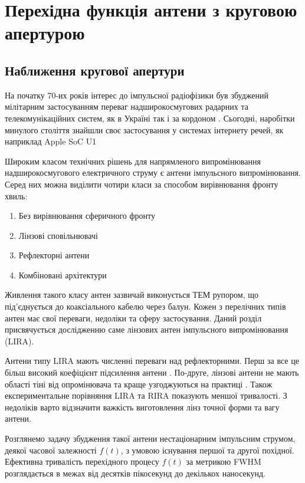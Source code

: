 \chapter{Перехідна функція антени з круговою апертурою}
\label{ch:linear}

\section{Наближення кругової апертури}

На початку 70-их років інтерес до імпульсної радіофізики був збуджений
мілітарним застосуванням переваг надширокосмугових радарних та 
телекомунікаційних систем, як в Україні \cite{imp:Dumin1996} так 
і за кордоном \cite{imp:BaumIN0105}. Сьогодні, наробітки минулого 
століття знайшли своє застосування у системах інтернету речей, як 
наприклад Apple SoC U1 %

Широким класом технічних рішень для напрямленого випромінювання 
надширокосмугового електричного струму є антени імпульсного випромінювання.
Серед них можна виділити чотири класи за способом вирівнювання фронту хвиль:
%
\begin{enumerate}
	\item Без вирівнювання сферичного фронту
	\item Лінзові сповільнювачі
	\item Рефлекторні антени
	\item Комбіновані архітектури \cite{imp:BaumSSN0379}
\end{enumerate}

Живлення такого класу антен зазвичай виконується ТЕМ рупором, що під'єднується 
до коаксіального кабелю через балун. Кожен з перелічних типів антен має свої
переваги, недоліки та сферу застосування. Даний розділ присвячується 
дослідженню саме лінзових антен імпульсного випромінювання (LIRA). 

Антени типу LIRA мають численні переваги над рефлекторними. Перш за все це
більш високий коефіцієнт підсилення антени \cite{imp:BaumUWBSP1}. По-друге,
лінзові антени не мають області тіні від опромінювача та краще узгоджуються
на практиці \cite{imp:BaumSSN0377}. Також експериментальне порівняння LIRA 
та RIRA показують меншої тривалості. З недоліків варто відзначити важкість 
виготовлення лінз точної форми та вагу антени.

Розглянемо задачу збудження такої антени нестаціонарним імпульсним струмом,
деякої часової залежності $ f(t) $, з умовою існування першої та другої 
похідної. Ефективна тривалість перехідного процесу $ f(t) $ за метрикою FWHM 
розглядається в межах від десятків пікосекунд до декількох наносекунд.

